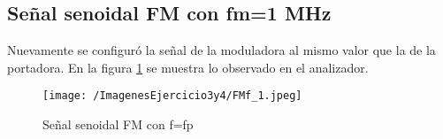 \subsection{Señal senoidal FM con fm=1 MHz}

Nuevamente se configuró la señal de la moduladora al mismo valor que la de la portadora. En la figura \ref{fig:fmf} se muestra lo observado en el analizador.

\begin{figure}[H]
	\centering
	\texttt{[image: /ImagenesEjercicio3y4/FMf\_1.jpeg]}
\caption{Señal senoidal FM con f=fp}
	\label{fig:fmf}
\end{figure}
